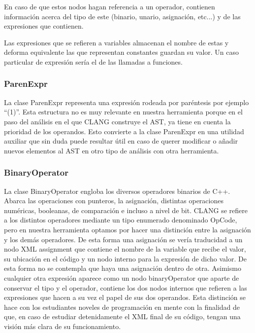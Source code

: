 En caso de que estos nodos hagan referencia a un operador, contienen información acerca del tipo de este (binario, unario, asignación, etc...) y de las expresiones que contienen.

Las expresiones que se refieren a variables almacenan el nombre de estas y deforma equivalente las que representan constantes guardan su valor. Un caso particular de expresión sería el de las llamadas a funciones.

\subsubsection*{ParenExpr}

La clase ParenExpr representa una expresión rodeada por paréntesis por ejemplo ``(1)''. Esta estructura no es muy relevante en nuestra herramienta porque en el paso del análisis en el que CLANG construye el AST, ya tiene en cuenta la prioridad de los operandos. Esto convierte a la clase ParenExpr en una utilidad auxiliar que sin duda puede resultar útil en caso de querer modificar o añadir nuevos elementos al AST en otro tipo de análisis con otra herramienta.

\subsubsection*{BinaryOperator}

La clase BinaryOperator engloba los diversos operadores binarios de C++. Abarca las operaciones con punteros, la asignación, distintas operaciones numéricas, booleanas, de comparación e incluso a nivel de bit. CLANG se refiere a los distintos operadores mediante un tipo enumerado denominado OpCode, pero en nuestra herramienta optamos por hacer una distinción entre la asignación y los demás operadores. De esta forma una asignación se vería traducidad a un nodo XML assignment que contiene el nombre de la variable que recibe el valor, su ubicación en el código y un nodo interno para la expresión de dicho valor. De esta forma no se contempla que haya una asignación dentro de otra. Asimismo cualquier otra expresión aparece como un nodo binaryOperator que aparte de conservar el tipo y el operador, contiene los dos nodos internos que refieren a las expresiones que hacen a su vez el papel de sus dos operandos. Esta distinción se hace con los estudiantes noveles de programación en mente con la finalidad de que, en caso de estudiar detenidamente el XML final de su código, tengan una visión más clara de su funcionamiento.

